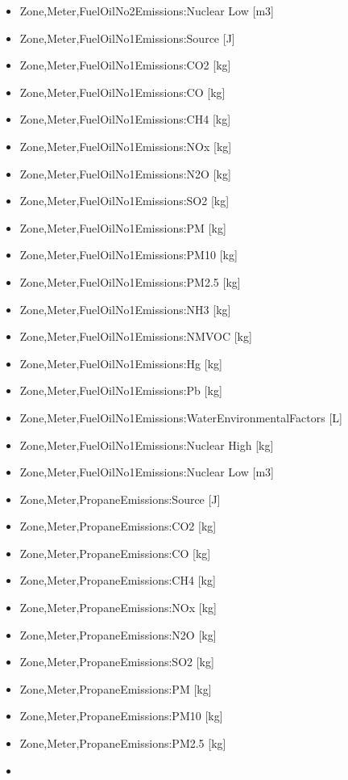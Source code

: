 \begin{itemize}
\item
  Zone,Meter,FuelOilNo2Emissions:Nuclear Low {[}m3{]}
\item
  Zone,Meter,FuelOilNo1Emissions:Source {[}J{]}
\item
  Zone,Meter,FuelOilNo1Emissions:CO2 {[}kg{]}
\item
  Zone,Meter,FuelOilNo1Emissions:CO {[}kg{]}
\item
  Zone,Meter,FuelOilNo1Emissions:CH4 {[}kg{]}
\item
  Zone,Meter,FuelOilNo1Emissions:NOx {[}kg{]}
\item
  Zone,Meter,FuelOilNo1Emissions:N2O {[}kg{]}
\item
  Zone,Meter,FuelOilNo1Emissions:SO2 {[}kg{]}
\item
  Zone,Meter,FuelOilNo1Emissions:PM {[}kg{]}
\item
  Zone,Meter,FuelOilNo1Emissions:PM10 {[}kg{]}
\item
  Zone,Meter,FuelOilNo1Emissions:PM2.5 {[}kg{]}
\item
  Zone,Meter,FuelOilNo1Emissions:NH3 {[}kg{]}
\item
  Zone,Meter,FuelOilNo1Emissions:NMVOC {[}kg{]}
\item
  Zone,Meter,FuelOilNo1Emissions:Hg {[}kg{]}
\item
  Zone,Meter,FuelOilNo1Emissions:Pb {[}kg{]}
\item
  Zone,Meter,FuelOilNo1Emissions:WaterEnvironmentalFactors {[}L{]}
\item
  Zone,Meter,FuelOilNo1Emissions:Nuclear High {[}kg{]}
\item
  Zone,Meter,FuelOilNo1Emissions:Nuclear Low {[}m3{]}
\item
  Zone,Meter,PropaneEmissions:Source {[}J{]}
\item
  Zone,Meter,PropaneEmissions:CO2 {[}kg{]}
\item
  Zone,Meter,PropaneEmissions:CO {[}kg{]}
\item
  Zone,Meter,PropaneEmissions:CH4 {[}kg{]}
\item
  Zone,Meter,PropaneEmissions:NOx {[}kg{]}
\item
  Zone,Meter,PropaneEmissions:N2O {[}kg{]}
\item
  Zone,Meter,PropaneEmissions:SO2 {[}kg{]}
\item
  Zone,Meter,PropaneEmissions:PM {[}kg{]}
\item
  Zone,Meter,PropaneEmissions:PM10 {[}kg{]}
\item
  Zone,Meter,PropaneEmissions:PM2.5 {[}kg{]}
\item

\end{itemize}
